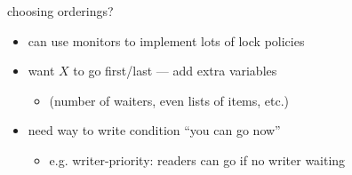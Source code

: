 
\begin{frame}{choosing orderings?}
\begin{itemize}
\item can use monitors to implement lots of lock policies
\item want $X$ to go first/last --- add extra variables
    \begin{itemize}
    \item (number of waiters, even lists of items, etc.)
    \end{itemize}
\item need way to write condition ``you can go now''
    \begin{itemize}
    \item e.g. writer-priority: readers can go if no writer waiting
    \end{itemize}
\end{itemize}
\end{frame}
